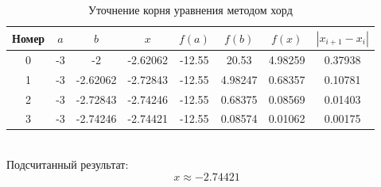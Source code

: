 \documentclass{article}
\begin{document}
\begin{table}[h]
\centering
\begin{tabular}{|*{8}{c|}}
    \hline
    Номер & $a$ & $b$ & $x$& $f(a)$& $f(b)$& $f(x)$& $|x_{i+1} - x_i|$  \\
    \hline
    0& -3& -2& -2.62062& -12.55& 20.53& 4.98259& 0.37938\\
    \hline
    1& -3& -2.62062& -2.72843& -12.55& 4.98247& 0.68357& 0.10781\\
    \hline
    2& -3& -2.72843& -2.74246& -12.55& 0.68375& 0.08569& 0.01403\\
    \hline
    3& -3& -2.74246& -2.74421& -12.55& 0.08574& 0.01062& 0.00175\\
    \hline

\end{tabular}
\caption{Уточнение корня уравнения методом хорд}
\end{table}
\\
Подсчитанный результат: 
\[x \approx -2.74421\]
\end{document}

